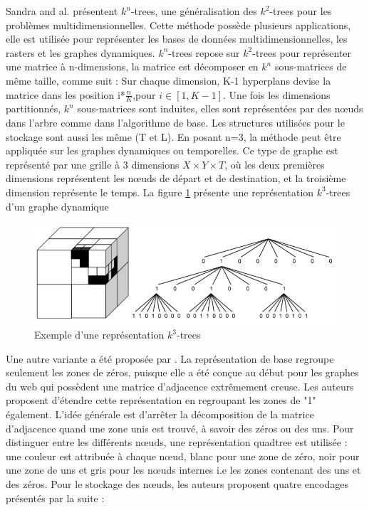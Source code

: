  Sandra and al. \citep{de2013compact} présentent $k^n$-trees, une généralisation des $k^2$-trees pour les problèmes multidimensionnelles. Cette méthode possède plusieurs applications, elle est utilisée pour représenter les bases de données multidimensionnelles, les rasters et les graphes dynamiques. $k^n$-trees repose sur $k^2$-trees pour représenter une matrice à n-dimensions, la matrice est décomposer en $k^n$ sous-matrices de même taille, comme suit : Sur chaque dimension, K-1 hyperplans devise la matrice dans les position i*$\frac{n}{K}$,pour $i \in [1, K-1]$. Une fois les dimensions partitionnés, $k^n$ sous-matrices sont induites, elles sont représentées par des nœuds dans l'arbre comme dans l'algorithme de base. Les structures utilisées pour le stockage sont aussi les même (T et L).
En posant n=3, la méthode peut être appliquée sur les graphes dynamiques ou temporelles. Ce type de graphe est représenté par une grille à 3 dimensions $X \times Y \times T$, où les deux premières dimensions représentent les nœuds de départ et de destination, et la troisième dimension représente le temps. 
La figure \ref{kn-trees} présente une représentation $k^3$-trees d'un graphe dynamique \citep{de2014new}

\begin{figure}[H]
\begin{center}
\includegraphics[height=100 pt, width=380 pt]{./ressources/image/kn-trees.png} 
\end{center}
\caption{Exemple d'une représentation $k^3$-trees}
\label{kn-trees}
\end{figure}



Une autre variante a été proposée par \citep{de2014new}. La représentation de base regroupe seulement les zones de zéros, puisque elle a été conçue au début pour les graphes du web qui possèdent une matrice d'adjacence extrêmement creuse. Les auteurs proposent d'étendre cette représentation en regroupant les zones de "1" également. L'idée générale est d'arrêter la décomposition de la matrice d'adjacence quand une zone unis est trouvé, à savoir des zéros ou des uns. Pour distinguer entre les différents nœuds, une représentation quadtree est utilisée \citep{de1997computational}: une couleur est attribuée à chaque nœud, blanc pour une zone de zéro, noir pour une zone de uns et gris pour les nœuds internes i.e les zones contenant des uns et des zéros. Pour le stockage des nœuds, les auteurs proposent quatre encodages présentés par la suite : \\

